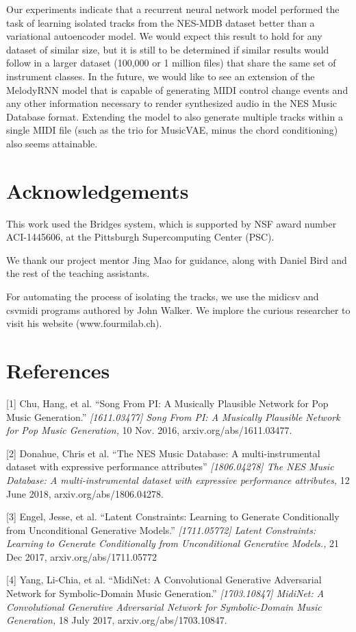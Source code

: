 \documentclass{article}
\begin{document}
Our experiments indicate that a recurrent neural network model performed the task of learning isolated tracks from the NES-MDB dataset better than a variational autoencoder model. We would expect this result to hold for any dataset of similar size, but it is still to be determined if similar results would follow in a larger dataset (100,000 or 1 million files) that share the same set of instrument classes. In the future, we would like to see an extension of the MelodyRNN model that is capable of generating MIDI control change events and any other information necessary to render synthesized audio in the NES Music Database format. Extending the model to also generate multiple tracks within a single MIDI file (such as the trio for MusicVAE, minus the chord conditioning) also seems attainable.

\section{Acknowledgements}
This work used the Bridges system, which is supported by NSF award number ACI-1445606, at the Pittsburgh Supercomputing Center (PSC).

We thank our project mentor Jing Mao for guidance, along with Daniel Bird and the rest of the teaching assistants.

For automating the process of isolating the tracks, we use the midicsv and csvmidi programs authored by John Walker. We implore the curious researcher to visit his website (www.fourmilab.ch).

\section*{References}

\small

[1] Chu, Hang, et al. ``Song From PI: A Musically Plausible Network for Pop Music Generation.'' {\it [1611.03477] Song From PI: A Musically Plausible Network for Pop Music Generation,} 10 Nov. 2016, arxiv.org/abs/1611.03477.

[2] Donahue, Chris et al. ``The NES Music Database: A multi-instrumental dataset with expressive performance attributes'' {\it [1806.04278] The NES Music Database: A multi-instrumental dataset with expressive performance attributes,} 12 June 2018, arxiv.org/abs/1806.04278.

[3] Engel, Jesse, et al. ``Latent Constraints: Learning to Generate Conditionally from Unconditional Generative Models.'' {\it[1711.05772] Latent Constraints: Learning to Generate Conditionally from Unconditional Generative Models.,} 21 Dec 2017, arxiv.org/abs/1711.05772

[4] Yang, Li-Chia, et al. ``MidiNet: A Convolutional Generative Adversarial Network for Symbolic-Domain Music Generation.'' {\it[1703.10847] MidiNet: A Convolutional Generative Adversarial Network for Symbolic-Domain Music Generation,} 18 July 2017, arxiv.org/abs/1703.10847.
\end{document}
